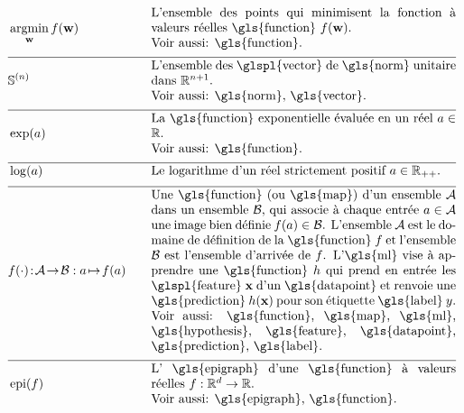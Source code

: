\newpage
\begin{align}
	&\argmin_{\weights} f(\weights) &\quad &\parbox{.70\textwidth}{L'ensemble des points qui minimisent la fonction à valeurs réelles \gls{function} $f(\weights)$. 
		\\ Voir aussi: \gls{function}.} \nonumber \\[2mm] \hline \nonumber\\[-5mm]
	&\sphere{\nrnodes} &\quad &\parbox{.70\textwidth}{L'ensemble des \glspl{vector} de \gls{norm} unitaire dans $\mathbb{R}^{\nrnodes+1}$.
		\\ Voir aussi: \gls{norm}, \gls{vector}.} \nonumber \\[2mm] \hline \nonumber\\[-5mm]
	& \exp(a) & \quad & \parbox{.70\textwidth}{La \gls{function} exponentielle évaluée en un réel $a \in \mathbb{R}$. 
		\\ Voir aussi: \gls{function}.} \nonumber \\[2mm] \hline \nonumber \\[-5mm]
	&\log(a) &\quad &\parbox{.70\textwidth}{Le logarithme d'un réel strictement positif $a \in \mathbb{R}_{++}$.} \nonumber \\[2mm] \hline \nonumber\\[-5mm]
	&f(\cdot)\!:\!\mathcal{A}\!\rightarrow\!\mathcal{B} :  a \!\mapsto\!f(a) &\quad &\parbox{.70\textwidth}{
		Une \gls{function} (ou \gls{map}) d'un ensemble $\mathcal{A}$ dans un ensemble $\mathcal{B}$, qui associe à chaque entrée
		$a \in \mathcal{A}$ une image bien définie $f(a) \in \mathcal{B}$.
		L'ensemble $\mathcal{A}$ est le domaine de définition de la \gls{function} $f$ et l'ensemble $\mathcal{B}$ est l'ensemble d'arrivée de $f$. L'\gls{ml} vise à apprendre une \gls{function} $\hypothesis$ qui prend en entrée les \glspl{feature} 
		$\featurevec$ d'un \gls{datapoint} et renvoie une \gls{prediction} $\hypothesis(\featurevec)$ pour son étiquette \gls{label} $\truelabel$.
		\\ Voir aussi: \gls{function}, \gls{map}, \gls{ml}, \gls{hypothesis}, \gls{feature}, \gls{datapoint}, \gls{prediction}, \gls{label}.} \nonumber \\[2mm] \hline \nonumber\\[-5mm]
	&\operatorname{epi}(f)  & \quad & \parbox{.70\textwidth}{L' \gls{epigraph} d'une \gls{function} à valeurs réelles
		$f: \mathbb{R}^{\featuredim}\rightarrow \mathbb{R}$.
		\\ Voir aussi: \gls{epigraph}, \gls{function}.} \nonumber
\end{align} 

